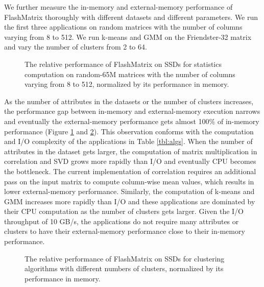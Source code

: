 We further measure the in-memory and external-memory performance of FlashMatrix
thoroughly with different datasets and
different parameters. We run the first three applications on random matrices
with the number of columns varying from 8 to 512. We run k-means
and GMM on the Friendster-32 matrix and vary the number of clusters from 2 to 64.

\begin{figure}
	\begin{center}
		\footnotesize
		\vspace{-15pt}
		
		\vspace{-10pt}
		\caption{The relative performance of FlashMatrix on SSDs for
			statistics computation on random-65M matrices with the number of
			columns varying from 8 to 512, normalized by its performance
		in memory.}
		\label{perf:stat}
	\end{center}
\end{figure}

As the number of attributes in the datasets or the number of clusters increases,
the performance gap between in-memory and external-memory execution
narrows and eventually the external-memory performance gets almost 100\%
of in-memory performance (Figure \ref{perf:stat} and \ref{perf:clust}).
This observation conforms with the computation and I/O complexity of
the applications in Table \ref{tbl:algs}. When the number of attributes
in the dataset gets larger, the computation of matrix multiplication in
correlation and SVD grows more rapidly than I/O and eventually CPU becomes
the bottleneck. The current implementation of correlation requires an additional
pass on the input matrix to compute column-wise mean values, which results in
lower external-memory performance. Similarly,
the computation of k-means and GMM increases more rapidly than I/O and
these applications are dominated by their CPU computation as the number
of clusters gets larger. Given the I/O throughput of 10 GB/s, the applications
do not require many attributes or clusters to have their external-memory
performance close to their in-memory performance.

\begin{figure}
	\begin{center}
		\footnotesize
		\vspace{-15pt}
		
		\vspace{-10pt}
		\caption{The relative performance of FlashMatrix on SSDs for
			clustering algorithms with different numbers of clusters, normalized
		by its performance in memory.}
		\label{perf:clust}
	\end{center}
\end{figure}

